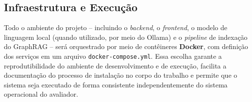 \subsection{Infraestrutura e Execução}
\label{sec-fundteo-stack-infra}

Todo o ambiente do projeto -- incluindo o \textit{backend}, o \textit{frontend},
o modelo de linguagem local (quando utilizado, por meio do Ollama) e o
\textit{pipeline} de indexação do GraphRAG -- será orquestrado por meio de
contêineres \textbf{Docker}, com definição dos serviços em um arquivo
\texttt{docker-compose.yml}. Essa escolha garante a reprodutibilidade do
ambiente de desenvolvimento e de execução, facilita a documentação do
processo de instalação no corpo do trabalho e permite que o sistema seja
executado de forma consistente independentemente do sistema operacional do
avaliador.
